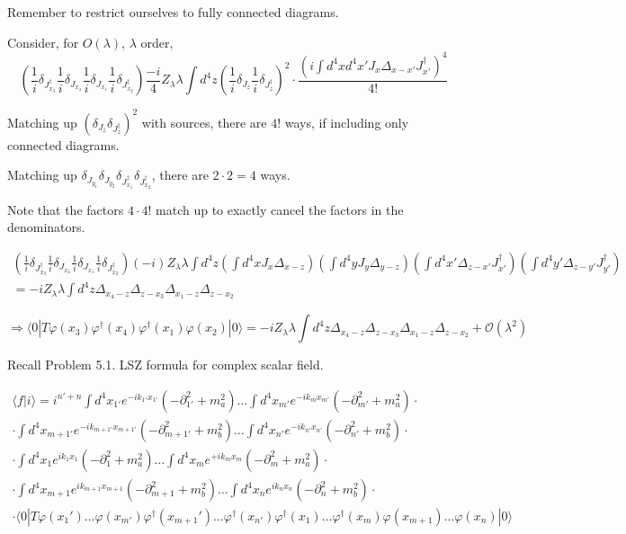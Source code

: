 \documentclass[twoside]{amsart}
\begin{document}

Remember to restrict ourselves to fully connected diagrams.  

Consider, for $O(\lambda)$, $\lambda$ order,
\[
\left( \frac{1}{i} \delta_{J^{\dag}_{x_3}} \frac{1}{i} \delta_{J_{x_4}} \frac{1}{i} \delta_{J_{x_1}} \frac{1}{i} \delta_{J^{\dag}_{x_2} } \right) \frac{-i}{4} Z_{\lambda} \lambda \int d^4z \left( \frac{1}{i} \delta_{J_z} \frac{1}{i} \delta_{J_z^{\dag}} \right)^2 \cdot \frac{ ( i \int d^4x d^4x' J_x \Delta_{x-x'} J_{x'}^{\dag})^4}{ 4! }
\]

Matching up $\left( \delta_{J_z} \delta_{J_z^{\dag}} \right)^2$ with sources, there are $4!$ ways, if including only connected diagrams.  

Matching up $\delta_{J_{y_1}} \delta_{J_{y_2}} \delta_{J^{\dag}_{x_1}} \delta_{J_{x_2}^{\dag}}$, there are $2 \cdot 2 =4$ ways.  

Note that the factors $4 \cdot 4!$ match up to exactly cancel the factors in the denominators.  

\[
\begin{gathered}
  \left(  \frac{1}{i} \delta_{J^{\dag}_{x_3}} \frac{1}{i} \delta_{J_{x_4}} \frac{1}{i} \delta_{J_{x_1}} \frac{1}{i} \delta_{J^{\dag}_{x_2} } \right)  (-i) Z_{\lambda} \lambda \int d^4z ( \int d^4x J_x \Delta_{x-z} )( \int d^4y J_y \Delta_{y-z} ) ( \int d^4x' \Delta_{z-x'} J^{\dag}_{x'} ) ( \int d^4y' \Delta_{z-y'} J^{\dag}_{y'} )  \\
  = -i Z_{\lambda} \lambda \int d^4z \Delta_{x_4 - z} \Delta_{z -x_3 } \Delta_{x_1-z} \Delta_{z-x_2}
\end{gathered}
\]

\[
\Longrightarrow   \langle 0 | T\varphi(x_3) \varphi^{\dag}(x_4) \varphi^{\dag}(x_1) \varphi(x_2) | 0 \rangle = -i Z_{\lambda} \lambda \int d^4z \Delta_{x_4 - z} \Delta_{z -x_3 } \Delta_{x_1-z} \Delta_{z-x_2} + \mathcal{O}(\lambda^2)
\]

Recall Problem 5.1.  LSZ formula for complex scalar field.  

\[
\begin{gathered}
  \langle f | i \rangle = i^{n' +n } \int d^4x_{1'} e^{- i k_{1'} x_{1'} } ( - \partial_{1'}^2 + m_a^2 )  \dots  \int d^4x_{m'} e^{-ik_m x_{m'} } (- \partial^2_{m'} + m_a^2 ) \cdot \\ 
  \cdot \int d^4x_{m+1'} e^{ - i k_{m+1'} x_{m+1'} } ( - \partial^2_{m+1'} + m_b^2 )  \dots  \int d^4x_{n'} e^{ - i k_{n'} x_{n'} } (- \partial_{n'}^2 + m_b^2 ) \cdot \\ 
  \cdot \int d^4x_1 e^{ik_1 x_1} (- \partial_1^2 + m_a^2) \dots  \int d^4x_m e^{+ i k_m x_m } (- \partial^2_m + m_a^2 ) \cdot \\
  \cdot \int d^4x_{m+1} e^{i k_{m+1} x_{m+1} } ( - \partial_{m+1}^2 + m_b^2 ) \dots \int d^4x_n e^{ik_n x_n } (- \partial_n^2 + m_b^2 ) \cdot \\  
  \cdot \langle 0 | T\varphi(x_1') \dots \varphi(x_{m'} ) \varphi^{\dag}(x_{m+1}' ) \dots \varphi^{\dag}(x_{n'}) \varphi^{\dag}(x_1) \dots \varphi^{\dag}(x_m) \varphi(x_{m+1}) \dots \varphi(x_n) | 0 \rangle 
\end{gathered}
\]
\end{document}
